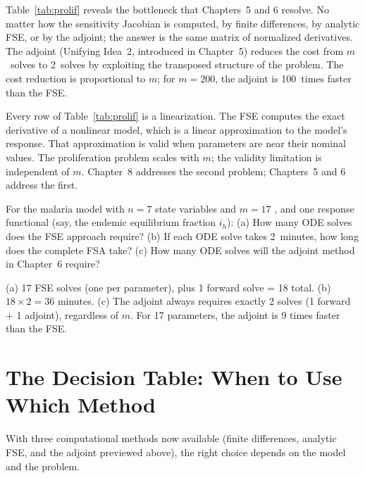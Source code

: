  Table~\ref{tab:prolif} reveals the bottleneck
that Chapters~5 and 6 resolve.
No matter how the sensitivity Jacobian is computed, by
finite differences, by analytic FSE, or by the adjoint;
the answer is the same matrix of normalized derivatives.
The adjoint (Unifying Idea~2, introduced in Chapter~5) reduces
the cost from $m$~solves to 2~solves by exploiting the
transposed structure of the problem. The cost reduction is
proportional to $m$; for $m = 200$, the adjoint is
100~times faster than the FSE.

 Every row of Table~\ref{tab:prolif} is a linearization.
The FSE computes the exact derivative of a nonlinear model, which
is a linear approximation to the model's response. That approximation
is valid when parameters are near their nominal values. The proliferation
problem scales with $m$; the validity limitation is independent of $m$.
Chapter~8 addresses the second problem; Chapters~5 and 6 address the first.

\begin{selfcheck}
For the malaria model with $n = 7$ state variables and $m = 17$
\POIs, and one response functional (say, the endemic equilibrium
fraction $i_h$):
(a) How many ODE solves does the FSE approach require?
(b) If each ODE solve takes 2~minutes, how long does the
    complete FSA take?
(c) How many ODE solves will the adjoint method in Chapter~6 require?
\end{selfcheck}
\begin{scAnswer}
(a) 17 FSE solves (one per parameter), plus 1 forward solve = 18 total.
(b) $18 \times 2 = 36$ minutes.
(c) The adjoint always requires exactly 2 solves (1 forward + 1 adjoint),
regardless of $m$.
For 17 parameters, the adjoint is 9 times faster than the FSE.
\end{scAnswer}

\section{The Decision Table: When to Use Which Method}
\label{sec:decisiontable}

With three computational methods now available (finite differences,
analytic FSE, and the adjoint previewed above), the right choice
depends on the model and the problem.

